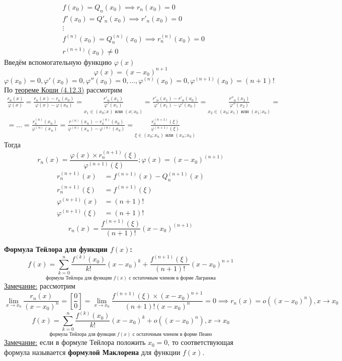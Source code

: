 \documentclass[12pt]{article}
\begin{document}
    \begin{adjustwidth}{1.5em}{1.5em}
        \begin{align*}
            &f(x_0) = Q_n(x_0) \implies r_n(x_0) = 0\\
            &f'(x_0) = Q'_n(x_0) \implies r'_n(x_0) = 0\\
            &\vdots\\
            &f^{(n)}(x_0) = Q^{(n)}_n(x_0) \implies r^{(n)}_n(x_0) = 0\\
            &r^{(n+1)}(x_0) \ne 0
        \end{align*}
        Введём вспомогательную функцию $\varphi(x)$
        \[ \varphi(x) = (x-x_0)^{n+1} \]
        \[ \varphi(x_0) = 0, \varphi'(x_0) = 0, \varphi''(x_0) = 0, \dots, \varphi^{(n)}(x_0) = 0, \varphi^{(n+1)}(x_0) = (n+1)! \]
        По \hyperref[th:4.12.3]{теореме Коши (4.12.3)} рассмотрим
        \begin{gather*}
            \boxed{ \frac{r_n(x)}{\varphi(x)} } = \frac{r_n(x) - r_n(x_0)}{\varphi(x) - \varphi(x_0)} = \underset{x_1 \in (x_0; x) \text{ или } (x; x_0)}{\frac{r'_n(x_1)}{\varphi'(x_1)}} = \frac{r'_n(x_1) - r'_n(x_0)}{\varphi'(x_1) - \varphi'(x_0)} = \underset{x_2 \in (x_0; x_1) \text{ или } (x_1; x_0)}{\frac{r''_n(x_2)}{\varphi''(x_2)}} =\\
            = \dots = \frac{r^{(n)}_n(x_n)}{\varphi^{(n)}(x_n)} = \frac{r^{(n)}(x_n) - r^{(n)}_n(x_0)}{\varphi^{(n)}(x_n)-\varphi^{(n)}(x_0)} = \underset{\xi \in (x_0;x_n) \text{ или } (x_n; x_0)}{\boxed{\frac{r^{(n+1)}_n(\xi)}{\varphi^{(n+1)}(\xi)}}}
        \end{gather*}
        Тогда \[ r_n(x) = \frac{\varphi(x) \times r^{(n+1)}_n(\xi)}{\varphi^{(n+1)}(\xi)}; \varphi(x) = (x-x_0)^{(n+1)} \]
        \begin{align*}
            r^{(n+1)}_n (x) &= f^{(n+1)}(x) - Q^{(n+1)}_n(x)\\
            r^{(n+1)}_n (\xi) &= f^{(n+1)}(\xi)\\
            \varphi^{(n+1)} (x) &= (n+1)!\\
            \varphi^{(n+1)} (\xi) &= (n+1)!
        \end{align*}
        \[ r_n(x) = \frac{f^{(n+1)}(\xi)}{(n+1)!}(x-x_0)^{(n+1)} \]
    \end{adjustwidth}
    \textbf{Формула Тейлора для функции $f(x)$:}
    \[ \underset{\text{формула Тейлора для функции }f(x)\text{ с остаточным членом в форме Лагранжа}}{\boxed{ f(x) = \sum_{k = 0}^{n} \frac{f^{(k)}(x_0)}{k!}(x-x_0)^k + \frac{f^{(n+1)}(\xi)}{(n+1)!}(x-x_0)^{n+1} }} \]
    \underline{Замечание:} рассмотрим 
    \[ \lim_{x\to x_0}\frac{r_n(x)}{(x-x_0)^n} = \left[\frac{0}{0}\right] = \lim_{x\to x_0} \frac{f^{(n+1)}(\xi) \times (x-x_0)^{n+1}}{(n+1)!(x-x_0)^n} = 0 \implies r_n(x) = o((x-x_0)^n), x \to x_0 \]
    \[ \underset{\text{формула Тейлора для функции }f(x)\text{ с остаточным членом в форме Пеано}}{ \boxed{ f(x) = \sum_{k=0}^{n}\frac{f^{(k)}(x_0)}{k!}(x-x_0)^k + o((x-x_0)^n), x \to x_0 } } \]
    \underline{Замечание:} если в формуле Тейлора положить $x_0 = 0$, то соответствующая формула называется \textbf{формулой Маклорена} для функции $f(x)$.
\end{document}
